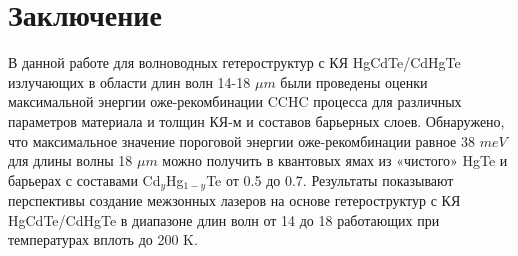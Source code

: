 \documentclass[../main.tex]{subfiles}
\begin{document}
    \chapter{Заключение}

    В данной работе для волноводных гетероструктур с КЯ HgCdTe/CdHgTe излучающих в области длин волн 14-18 $\mu m$ были проведены оценки максимальной
    энергии оже-рекомбинации CCHC процесса для различных параметров материала и толщин КЯ-м и составов барьерных слоев. Обнаружено, что 
    максимальное значение пороговой энергии оже-рекомбинации равное 38 $meV$ для длины волны 18 $\mu m$ можно получить в квантовых ямах из «чистого»  
    HgTe и барьерах с составами  Cd${}_{y}$Hg${}_{1-y}$Te от 0.5 до 0.7.  Результаты показывают перспективы создание межзонных лазеров на основе  гетероструктур с 
    КЯ HgCdTe/CdHgTe в диапазоне длин волн от 14 до 18 работающих при температурах вплоть до 200 K. 
\end{document}
